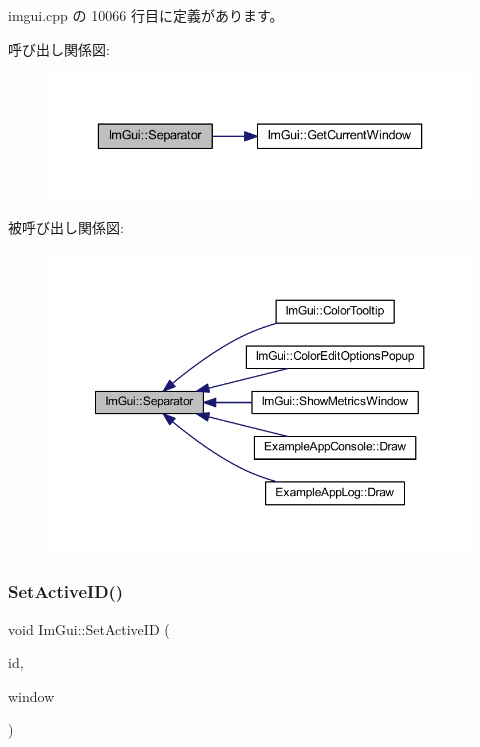  imgui.\+cpp の 10066 行目に定義があります。

呼び出し関係図\+:\nopagebreak
\begin{figure}[H]
\begin{center}
\leavevmode
\includegraphics[width=336pt]{namespace_im_gui_a191123597a5084d003c8beac7eeb029e_cgraph}
\end{center}
\end{figure}
被呼び出し関係図\+:\nopagebreak
\begin{figure}[H]
\begin{center}
\leavevmode
\includegraphics[width=350pt]{namespace_im_gui_a191123597a5084d003c8beac7eeb029e_icgraph}
\end{center}
\end{figure}
\mbox{\label{namespace_im_gui_a27b8ace13a8c421ee8405f0cbebe4ead}} 
\subsubsection{\texorpdfstring{Set\+Active\+I\+D()}{SetActiveID()}}
{\footnotesize\ttfamily void Im\+Gui\+::\+Set\+Active\+ID (\begin{DoxyParamCaption}\item[{\mbox{\hyperlink{imgui_8h_a1785c9b6f4e16406764a85f32582236f}{Im\+Gui\+ID}}}]{id,  }\item[{\mbox{\hyperlink{struct_im_gui_window}{Im\+Gui\+Window}} $\ast$}]{window }\end{DoxyParamCaption})}



